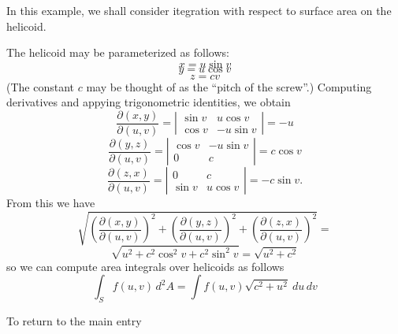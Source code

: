 \documentclass[12pt]{article}
\begin{document}
In this example, we shall consider itegration with respect to surface area on the helicoid.

The helicoid may be parameterized as follows:
 $$x = u \sin v$$
 $$y = u \cos v$$
 $$z = c v$$
(The constant $c$ may be thought of as the ``pitch of the screw''.)  Computing derivatives and appying trigonometric identities, we obtain
$$\frac{\partial (x, y)}{\partial (u,v)} =
\left| \begin{matrix}
\sin v & u \cos v \\
\cos v & - u \sin v
\end{matrix} \right| =
- u$$
$$\frac{\partial (y, z)}{\partial (u,v)} =
\left| \begin{matrix}
\cos v & - u \sin v \\
0 & c
\end{matrix} \right| =
c \cos v$$
$$\frac{\partial (z, x)}{\partial (u,v)} =
\left| \begin{matrix}
0 & c \\
\sin v & u \cos v
\end{matrix} \right| =
- c \sin v.$$
From this we have
 $$\sqrt{ \left(  \frac{\partial (x,y)}{\partial (u,v)} \right)^2 +  \left( \frac{\partial (y,z)}{\partial (u,v)} \right)^2 + \left( \frac{\partial (z,x)}{\partial (u,v)} \right)^2 } =$$
 $$\sqrt{ u^2 + c^2 \cos^2 v + c^2 \sin^2 v } = \sqrt { u^2 + c^2 }$$
so we can compute area integrals over helicoids as follows
 $$\int_S f(u,v) \, d^2 A = \int f(u,v) \sqrt{ c^2 + u^2 } \> du \, dv$$

To return to the main entry 
\end{document}
